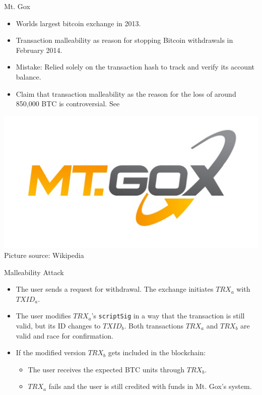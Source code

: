 \documentclass[handout]{beamer}
\begin{document}
\begin{frame}{Mt. Gox}
	\centering
		\begin{itemize}
			\item Worlds largest bitcoin exchange in 2013.
			\item Transaction malleability as reason for stopping Bitcoin withdrawals in February 2014.
			\item Mistake: Relied solely on the transaction hash to track and verify its account balance.
			\item Claim that transaction malleability as the reason for the loss of around 850,000 BTC is controversial. See \cite{Decker2014}
		\end{itemize}
	\includegraphics[scale=0.12]{../assets/images/mt_gox}\\
	\footnotesize{Picture source: Wikipedia}	
\end{frame}


\begin{frame}{Malleability Attack}
	\centering
	\begin{tikzpicture}[squarednode/.style = {rectangle, draw=black!60, fill=black!5}]
		
	\end{tikzpicture}
	\begin{itemize}	
		\item<1->[1.] The user sends a request for withdrawal. The exchange initiates $TRX_a$ with $TXID_a$.
		\item<3->[2.] The user modifies $TRX_a$'s \texttt{scriptSig} in a way that the transaction is still valid, but its ID changes to $TXID_b$. Both transactions $TRX_a$ and $TRX_b$ are valid and race for confirmation.
		\item<4->[3.] If the modified version $TRX_b$ gets included in the blockchain:
		\begin{itemize}
			\item The user receives the expected BTC units through $TRX_b$.
			\item $TRX_a$ fails and the user is still credited with funds in Mt. Gox's system.
		\end{itemize}
	\end{itemize}
\end{frame}
\end{document}
